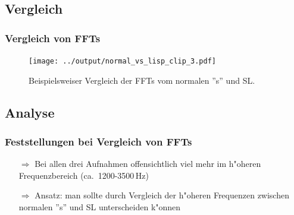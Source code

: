 \documentclass[11pt]{beamer}
\begin{document}
\subsection{Vergleich}

\begin{frame}
\frametitle{Vergleich von FFTs}
\begin{figure}
\texttt{[image: ../output/normal\_vs\_lisp\_clip\_3.pdf]}
\caption{Beispielsweiser Vergleich der FFTs vom normalen ''s'' und SL.}
\end{figure}
\end{frame}

\subsection{Analyse}

\begin{frame}
\frametitle{Feststellungen bei Vergleich von FFTs}
\begin{itemize}
\item[$\Rightarrow$] Bei allen drei Aufnahmen offensichtlich viel mehr im h"oheren Frequenzbereich (ca.\ 1200-3500\,Hz)
\item[$\Rightarrow$] Ansatz: man sollte durch Vergleich der h"oheren Frequenzen zwischen normalen ''s'' und SL unterscheiden k"onnen
\end{itemize}
\end{frame}
\end{document}
